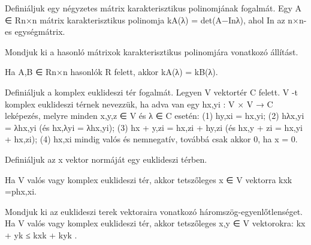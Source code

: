 \begin{frame}
  \begin{tcolorbox}[title={37}]
    Deﬁniáljuk egy négyzetes mátrix karakterisztikus polinomjának fogalmát.
  \tcblower
Egy A ∈ Rn×n mátrix karakterisztikus polinomja kA(λ) = det(A−Inλ), ahol In az n×n-es egységmátrix.

  \end{tcolorbox}
\end{frame}


\begin{frame}
  \begin{tcolorbox}[title={38}]
    Mondjuk ki a hasonló mátrixok karakterisztikus polinomjára vonatkozó állítást.

  \tcblower
Ha A,B ∈ Rn×n hasonlók R felett, akkor kA(λ) = kB(λ).

  \end{tcolorbox}
\end{frame}


\begin{frame}
  \begin{tcolorbox}[title={39}]
   Deﬁniáljuk a komplex euklideszi tér fogalmát.
  \tcblower
Legyen V vektortér C felett. V -t komplex euklideszi térnek nevezzük, ha adva van egy hx,yi : V × V → C leképezés, melyre minden x,y,z ∈ V és λ ∈ C esetén: (1) hy,xi = hx,yi; (2) hλx,yi = λhx,yi (és hx,λyi = λhx,yi); (3) hx + y,zi = hx,zi + hy,zi (és hx,y + zi = hx,yi + hx,zi); (4) hx,xi mindig valós és nemnegatív, továbbá csak akkor 0, ha x = 0.

  \end{tcolorbox}
\end{frame}


\begin{frame}
  \begin{tcolorbox}[title={40}]
   Deﬁniáljuk az x vektor normáját egy euklideszi térben.

  \tcblower
Ha V valós vagy komplex euklideszi tér, akkor tetszőleges x ∈ V vektorra kxk =phx,xi.

  \end{tcolorbox}
\end{frame}


\begin{frame}
  \begin{tcolorbox}[title={41}]
     Mondjuk ki az euklideszi terek vektoraira vonatkozó háromszög-egyenlőtlenséget.
  \tcblower
Ha V valós vagy komplex euklideszi tér, akkor tetszőleges x,y ∈ V vektorokra: kx + yk ≤ kxk + kyk .

  \end{tcolorbox}
\end{frame}


